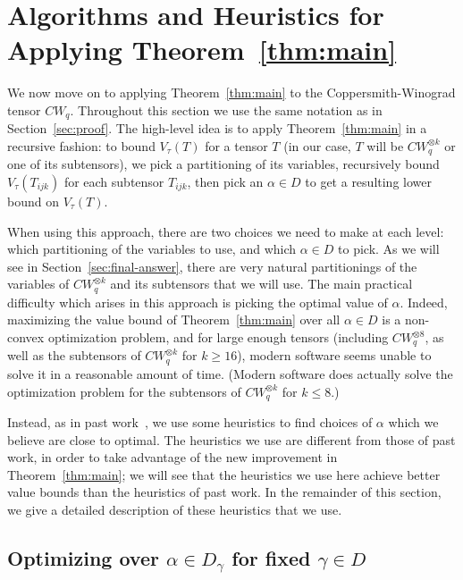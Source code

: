 \PassOptionsToPackage{shortlabels}{enumitem}\documentclass[10pt,a4paper]{article}
\begin{document}
\section{Algorithms and Heuristics for Applying Theorem~\ref{thm:main}} \label{sec:heuristics}

We now move on to applying Theorem~\ref{thm:main} to the Coppersmith-Winograd tensor $CW_q$. Throughout this section we use the same notation as in Section~\ref{sec:proof}. The high-level idea is to apply Theorem~\ref{thm:main} in a recursive fashion: to bound $V_\tau(T)$ for a tensor $T$ (in our case, $T$ will be $CW_q^{\otimes k}$ or one of its subtensors), we pick a partitioning of its variables, recursively bound $V_\tau(T_{ijk})$ for each subtensor $T_{ijk}$, then pick an $\alpha \in D$ to get a resulting lower bound on $V_\tau(T)$.

When using this approach, there are two choices we need to make at each level: which partitioning of the variables to use, and which $\alpha \in D$ to pick. As we will see in Section~\ref{sec:final-answer}, there are very natural partitionings of the variables of $CW_q^{\otimes k}$ and its subtensors that we will use. The main practical difficulty which arises in this approach is picking the optimal value of $\alpha$. Indeed, maximizing the value bound of Theorem~\ref{thm:main} over all $\alpha \in D$ is a non-convex optimization problem, and for large enough tensors (including $CW_q^{\otimes 8}$, as well as the subtensors of $CW_q^{\otimes k}$ for $k \geq 16$), modern software seems unable to solve it in a reasonable amount of time. (Modern software does actually solve the optimization problem for the subtensors of $CW_q^{\otimes k}$ for $k\leq 8$.)

Instead, as in past work~\cite{v12,legall}, we use some heuristics to find choices of $\alpha$ which we believe are close to optimal. The heuristics we use are different from those of past work, in order to take advantage of the new improvement in Theorem~\ref{thm:main}; we will see that the heuristics we use here achieve better value bounds than the heuristics of past work. In the remainder of this section, we give a detailed description of these heuristics that we use.

\subsection{Optimizing over \texorpdfstring{$\alpha \in D_{\gamma}$}{alpha in D gamma} for fixed \texorpdfstring{$\gamma \in D$}{gamma in D}} \label{subsec:optgamma}
\end{document}
